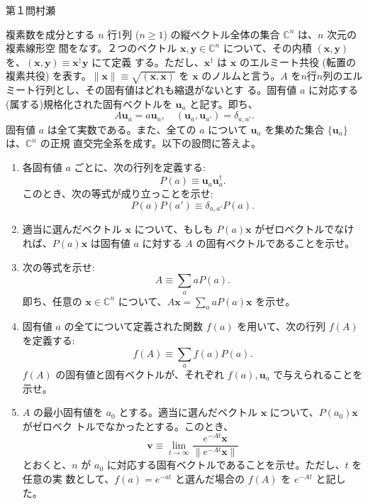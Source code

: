 \begin{question}{第１問}{村瀬}

複素数を成分とする $n$ 行1列 ($n\geq1$) の縦ベクトル全体の集合 $\mathbb{C}^n$ は、$n$ 次元の複素線形空
間をなす。２つのベクトル $\bm x, \bm y\in\mathbb C^n$ について、その内積 $(\bm x,\bm y)$ を、$(\bm x,\bm y)\equiv \bm x^\dag\bm y$ にて定義
する。ただし、$\bm x^\dag$ は $\bm x$ のエルミート共役 (転置の複素共役) を表す。$\|\bm x\|\equiv\sqrt{(\bm x,\bm x)}$ を $\bm x$
のノルムと言う。$A$ を$n$行$n$列のエルミート行列とし、その固有値はどれも縮退がないとす
る。固有値 $a$ に対応する(属する)規格化された固有ベクトルを $\bm u_a$ と記す。即ち、
\[
  A\bm u_a=a\bm u_a,
  \quad (\bm u_a,\bm u_{a'})=\delta_{a,a'}.
\]
固有値 $a$ は全て実数である。また、全ての $a$ について $\bm u_a$ を集めた集合 $\{\bm u_a\}$ は、$\mathbb C^n$ の正規
直交完全系を成す。以下の設問に答えよ。
\begin{enumerate}
\item
  各固有値 $a$ ごとに、次の行列を定義する:
  \[P(a)\equiv\bm u_a\bm u_a^\dag.\]
  このとき、次の等式が成り立っことを示せ:
  \[P(a)P(a')\equiv\delta_{a,a'}P(a).\]
\item 
  適当に選んだベクトル $\bm x$ について、もしも $P(a)\bm x$ がゼロベクトルでなければ、$P(a)\bm x$
  は固有値 $a$ に対する $A$ の固有ベクトルであることを示せ。
\item 
  次の等式を示せ:
  \[A\equiv\sum_a aP(a).\]
  即ち、任意の $\bm x\in\mathbb C^n$ について、$A\bm x=\sum_a aP(a)\bm x$ を示せ。
\item 
  固有値 $a$ の全てについて定義された関数 $f(a)$ を用いて、次の行列 $f(A)$ を定義する:
  \[f(A)\equiv\sum_af(a)P(a).\]
  $f(A)$ の固有値と固有ベクトルが、それぞれ $f(a), \bm u_a$ で与えられることを示せ。
\item 
$A$ の最小固有値を $a_0$ とする。適当に選んだベクトル $\bm x$ について、$P(a_0)\bm x$ がゼロベク
トルでなかったとする。このとき、
\[
  \bm v\equiv\lim_{t\to\infty}\frac{e^{-At}\bm x}{\|e^{-At}\bm x\|}
\]
とおくと、$n$ が $a_0$ に対応する固有ベクトルであることを示せ。ただし、$t$ を任意の実
数として、$f(a)=e^{-at}$ と選んだ場合の $f(A)$ を $e^{-At}$ と記した。
\end{enumerate}
\end{question}

